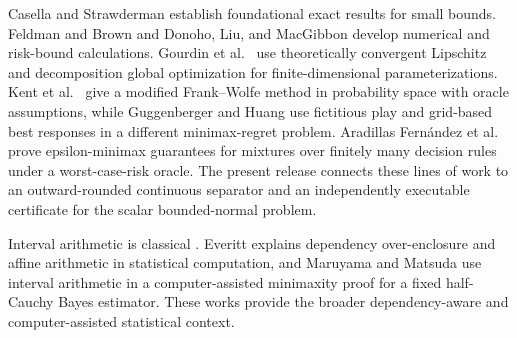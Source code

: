 Casella and Strawderman \cite{casella1981} establish foundational exact
results for small bounds.  Feldman and Brown \cite{feldman1989} and Donoho,
Liu, and MacGibbon \cite{donoho1990} develop numerical and risk-bound
calculations.  Gourdin et al.\ \cite{gourdin1994} use theoretically convergent
Lipschitz and decomposition global optimization for finite-dimensional
parameterizations.  Kent et al.\ \cite{kent2021} give a modified
Frank--Wolfe method in probability space with oracle assumptions, while
Guggenberger and Huang \cite{guggenberger2025} use fictitious play and
grid-based best responses in a different minimax-regret problem.  Aradillas
Fernández et al.\ \cite{aradillas2026} prove epsilon-minimax guarantees for
mixtures over finitely many decision rules under a worst-case-risk oracle.
The present release connects these lines of work to an outward-rounded
continuous separator and an independently executable certificate for the
scalar bounded-normal problem.

Interval arithmetic is classical \cite{moore2009}.  Everitt
\cite{everitt2018} explains dependency over-enclosure and affine arithmetic
in statistical computation, and Maruyama and Matsuda \cite{maruyama2025}
use interval arithmetic in a computer-assisted minimaxity proof for a fixed
half-Cauchy Bayes estimator.  These works provide the broader
dependency-aware and computer-assisted statistical context.
